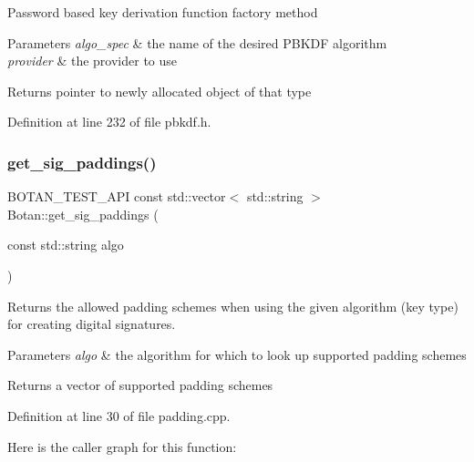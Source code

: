 Password based key derivation function factory method 
\begin{DoxyParams}{Parameters}
{\em algo\+\_\+spec} & the name of the desired P\+B\+K\+DF algorithm \\
\hline
{\em provider} & the provider to use \\
\hline
\end{DoxyParams}
\begin{DoxyReturn}{Returns}
pointer to newly allocated object of that type 
\end{DoxyReturn}


Definition at line 232 of file pbkdf.\+h.

\mbox{\label{namespace_botan_a68b05d4e236673d9d185cbfb1144cebc}} 
\subsubsection{\texorpdfstring{get\+\_\+sig\+\_\+paddings()}{get\_sig\_paddings()}}
{\footnotesize\ttfamily B\+O\+T\+A\+N\+\_\+\+T\+E\+S\+T\+\_\+\+A\+PI const std\+::vector$<$ std\+::string $>$ Botan\+::get\+\_\+sig\+\_\+paddings (\begin{DoxyParamCaption}\item[{const std\+::string}]{algo }\end{DoxyParamCaption})}

Returns the allowed padding schemes when using the given algorithm (key type) for creating digital signatures.


\begin{DoxyParams}{Parameters}
{\em algo} & the algorithm for which to look up supported padding schemes \\
\hline
\end{DoxyParams}
\begin{DoxyReturn}{Returns}
a vector of supported padding schemes 
\end{DoxyReturn}


Definition at line 30 of file padding.\+cpp.

Here is the caller graph for this function\+:
\mbox{\label{namespace_botan_abb6896c37db627e3ab8e1fa7c72f79fd}} 

